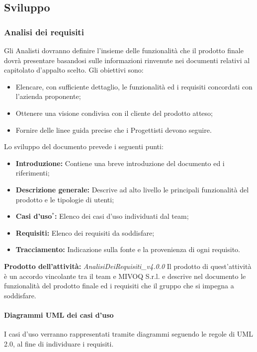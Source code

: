 \documentclass[11pt,a4paper]{article}
\begin{document}
{	\subsection{Sviluppo}
	\subsubsection{Analisi dei requisiti}
	Gli Analisti dovranno definire l'insieme delle funzionalità che il prodotto finale dovrà presentare basandosi sulle informazioni rinvenute nei documenti relativi al capitolato d'appalto scelto. Gli obiettivi sono:
	\begin{itemize}
		\item Elencare, con sufficiente dettaglio, le funzionalità ed i requisiti concordati con l'azienda proponente;
		\item Ottenere una visione condivisa con il cliente del prodotto atteso;
		\item Fornire delle linee guida precise che i Progettisti devono seguire.
	\end{itemize}
	Lo sviluppo del documento prevede i seguenti punti:	
	\begin{itemize}
		\item \textbf{Introduzione:} Contiene una breve introduzione del documento ed i riferimenti;
		\item \textbf{Descrizione generale:} Descrive ad alto livello le principali funzionalità del prodotto e le tipologie di utenti;
		\item \textbf{Casi d'uso$^*$:} Elenco dei casi d'uso individuati dal team;
		\item \textbf{Requisiti:} Elenco dei requisiti da soddisfare;
		\item \textbf{Tracciamento:} Indicazione sulla fonte e la provenienza di ogni requisito.
	\end{itemize}
	
	\textbf{Prodotto dell'attività:} \textit{AnalisiDeiRequisiti\_v4.0.0}
	\newline
	Il prodotto di quest'attività è un accordo vincolante tra il team e MIVOQ S.r.l. e descrive nel documento le funzionalità del prodotto finale ed i requisiti che il gruppo che si impegna a soddisfare.
	
	\paragraph{Diagrammi UML dei casi d'uso\\}
	 I casi d'uso verranno rappresentati tramite diagrammi seguendo le regole di UML 2.0, al fine di individuare i requisiti.
}
\end{document}
